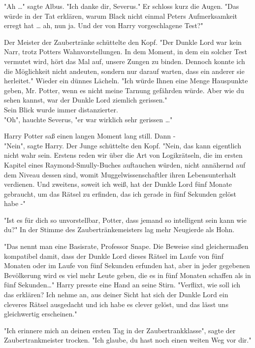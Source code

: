 {"Ah …" sagte Albus. "Ich danke dir, Severus." Er schloss kurz die Augen. "Das würde in der Tat erklären, warum Black nicht einmal Peters Aufmerksamkeit erregt hat … ah, nun ja. Und der von Harry vorgeschlagene Test?"

Der Meister der Zaubertränke schüttelte den Kopf. "Der Dunkle Lord war kein Narr, trotz Potters Wahnvorstellungen. In dem Moment, in dem ein solcher Test vermutet wird, hört das Mal auf, unsere Zungen zu binden. Dennoch konnte ich die Möglichkeit nicht andeuten, sondern nur darauf warten, dass ein anderer sie herleitet." Wieder ein dünnes Lächeln. "Ich würde Ihnen eine Menge Hauspunkte geben, Mr. Potter, wenn es nicht meine Tarnung gefährden würde. Aber wie du sehen kannst, war der Dunkle Lord ziemlich gerissen."\\ Sein Blick wurde immer distanzierter.\\ "Oh", hauchte Severus, "er war wirklich sehr gerissen …"

Harry Potter saß einen langen Moment lang still. Dann -\\ "Nein", sagte Harry. Der Junge schüttelte den Kopf. "Nein, das kann eigentlich nicht wahr sein. Erstens reden wir über die Art von Logikrätseln, die im ersten Kapitel eines Raymond-Smully-Buches auftauchen würden, nicht annähernd auf dem Niveau dessen sind, womit Muggelwissenschaftler ihren Lebensunterhalt verdienen. Und zweitens, soweit ich weiß, hat der Dunkle Lord fünf Monate gebraucht, um das Rätsel zu erfinden, das ich gerade in fünf Sekunden gelöst habe -"

"Ist es für dich so unvorstellbar, Potter, dass jemand so intelligent sein kann wie du?" In der Stimme des Zaubertränkemeisters lag mehr Neugierde als Hohn.

"Das nennt man eine Basisrate, Professor Snape. Die Beweise sind gleichermaßen kompatibel damit, dass der Dunkle Lord dieses Rätsel im Laufe von fünf Monaten oder im Laufe von fünf Sekunden erfunden hat, aber in jeder gegebenen Bevölkerung wird es viel mehr Leute geben, die es in fünf Monaten schaffen als in fünf Sekunden…" Harry presste eine Hand an seine Stirn. "Verflixt, wie soll ich das erklären? Ich nehme an, aus deiner Sicht hat sich der Dunkle Lord ein cleveres Rätsel ausgedacht und ich habe es clever gelöst, und das lässt uns gleichwertig erscheinen."

"Ich erinnere mich an deinen ersten Tag in der Zaubertrankklasse", sagte der Zaubertrankmeister trocken. "Ich glaube, du hast noch einen weiten Weg vor dir."

}

